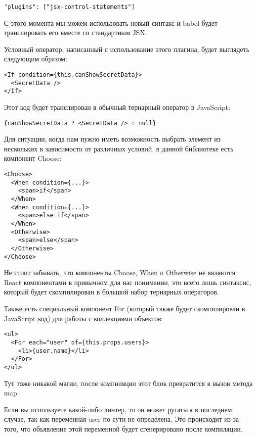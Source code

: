 \begin{lstlisting}
"plugins": ["jsx-control-statements"]
\end{lstlisting}

С этого момента мы можем использовать новый синтакс и babel будет транслировать его вместе со стандартным JSX.

Условный оператор, написанный с использование этого плагина, будет выглядеть следующим образом:

\begin{lstlisting}
<If condition={this.canShowSecretData}>
  <SecretData />
</If>
\end{lstlisting}

Этот код будет транслирован в обычный тернарный оператор в JavaScript:

\begin{lstlisting}
{canShowSecretData ? <SecretData /> : null}
\end{lstlisting}

Для ситуации, когда нам нужно иметь возможность выбрать элемент из нескольких в зависимости от различных условий, в данной библиотеке есть компонент Choose:

\begin{lstlisting}
<Choose>
  <When condition={...}>
    <span>if</span>
  </When>
  <When condition={...}>
    <span>else if</span>
  </When>
  <Otherwise>
    <span>else</span>
  </Otherwise>
</Choose>
\end{lstlisting}

Не стоит забывать, что компоненты Choose, When и Otherwise не являются React компонентами в привычном для нас понимании, это всего лишь синтаксис, который будет скомпилирован в большой набор тернарных операторов.

Также есть специальный компонент For (который также будет скомпилирован в JavaScript код) для работы с коллекциями объектов:

\begin{lstlisting}
<ul>
  <For each="user" of={this.props.users}>
    <li>{user.name}</li>
  </For>
</ul>
\end{lstlisting}

Тут тоже никакой магии, после компиляции этот блок превратится в вызов метода map.

Если вы используете какой-либо линтер, то он может ругаться в последнем случае, так как переменная user по сути не определена. Это происходит из-за того, что объявление этой переменной будет сгенерировано после компиляции.

